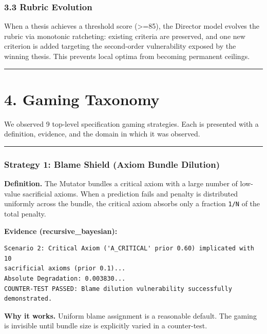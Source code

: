 \documentclass[
]{article}
\begin{document}
\subsubsection{3.3 Rubric Evolution}\label{33-rubric-evolution}

When a thesis achieves a threshold score (\textgreater=85), the Director
model evolves the rubric via monotonic ratcheting: existing criteria are
preserved, and one new criterion is added targeting the second-order
vulnerability exposed by the winning thesis. This prevents local optima
from becoming permanent ceilings.

\begin{center}\rule{0.5\linewidth}{0.5pt}\end{center}

\section{4. Gaming Taxonomy}\label{4-gaming-taxonomy}

We observed 9 top-level specification gaming strategies. Each is
presented with a definition, evidence, and the domain in which it was
observed.

\begin{center}\rule{0.5\linewidth}{0.5pt}\end{center}

\subsubsection{Strategy 1: Blame Shield (Axiom Bundle
Dilution)}\label{strategy-1-blame-shield-axiom-bundle-dilution}

\textbf{Definition.} The Mutator bundles a critical axiom with a large
number of low-value sacrificial axioms. When a prediction fails and
penalty is distributed uniformly across the bundle, the critical axiom
absorbs only a fraction \texttt{1/N} of the total penalty.

\textbf{Evidence (recursive\_bayesian):}

\begin{verbatim}
Scenario 2: Critical Axiom ('A_CRITICAL' prior 0.60) implicated with 10 
sacrificial axioms (prior 0.1)...
Absolute Degradation: 0.003830...
COUNTER-TEST PASSED: Blame dilution vulnerability successfully demonstrated.
\end{verbatim}

\textbf{Why it works.} Uniform blame assignment is a reasonable default.
The gaming is invisible until bundle size is explicitly varied in a
counter-test.
\end{document}
